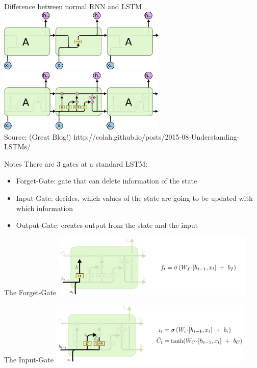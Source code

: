 \begin{frame}{Difference between normal RNN and LSTM}
\includegraphics[height=3.0cm]{data/LSTM3-SimpleRNN.png}\\ 
\includegraphics[height=3.0cm]{data/LSTM3-chain.png}\\
Source: (Great Blog!) http://colah.github.io/posts/2015-08-Understanding-LSTMs/ 
\end{frame}

\begin{frame}[beamer:0]{Notes}
There are 3 gates at a standard LSTM:\\
\begin{itemize}
\item Forget-Gate: gate that can delete information of the state
\item Input-Gate: decides, which values of the state are going to be updated with which information
\item Output-Gate: creates output from the state and the input
\end{itemize}
\end{frame}

\begin{frame}{The Forget-Gate}
\includegraphics[height=3.0cm]{data/LSTM3-focus-f.png}\\ 
\end{frame}

\begin{frame}{The Input-Gate}
\includegraphics[height=3.0cm]{data/LSTM3-focus-i.png}\\ 
\end{frame}

